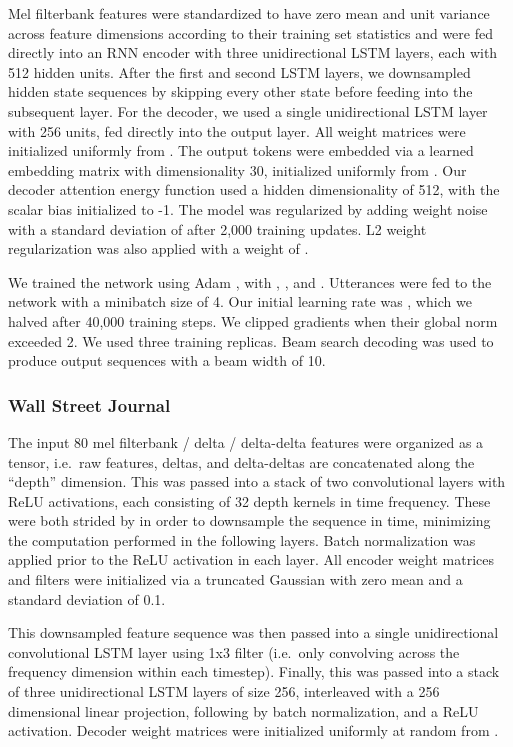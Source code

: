 \documentclass{article}
\begin{document}
Mel filterbank features were standardized to have zero mean and unit variance across feature dimensions according to their training set statistics and were fed directly into an RNN encoder with three unidirectional LSTM layers, each with 512 hidden units.
After the first and second LSTM layers, we downsampled hidden state sequences by skipping every other state before feeding into the subsequent layer.
For the decoder, we used a single unidirectional LSTM layer with 256 units, fed directly into the output  layer.
All weight matrices were initialized uniformly from .
The output tokens were embedded via a learned embedding matrix with dimensionality 30, initialized uniformly from  .
Our decoder attention energy function used a hidden dimensionality of 512, with the scalar bias  initialized to -1.
The model was regularized by adding weight noise with a standard deviation of  after 2,000 training updates.
L2 weight regularization was also applied with a weight of .

We trained the network using Adam , with , , and .
Utterances were fed to the network with a minibatch size of 4.
Our initial learning rate was , which we halved after 40,000 training steps.
We clipped gradients when their global norm exceeded 2.
We used three training replicas.
Beam search decoding was used to produce output sequences with a beam width of 10.

\subsubsection{Wall Street Journal}
\label{sec:wsj_details}

The input 80 mel filterbank / delta / delta-delta features were organized as a  tensor, i.e.\ raw features, deltas, and delta-deltas are concatenated along the ``depth'' dimension.
This was passed into a stack of two convolutional layers with ReLU activations, each consisting of 32  depth kernels in time  frequency.
These were both strided by  in order to downsample the sequence in time, minimizing the computation performed in the following layers.
Batch normalization  was applied prior to the ReLU activation in each layer.
All encoder weight matrices and filters were initialized via a truncated Gaussian with zero mean and a standard deviation of 0.1.

This downsampled feature sequence was then passed into a single unidirectional convolutional LSTM layer using 1x3 filter (i.e.\ only convolving across the frequency dimension within each timestep).
Finally, this was passed into a stack of three unidirectional LSTM layers of size 256, interleaved with a 256 dimensional linear projection, following by batch normalization, and a ReLU activation.
Decoder weight matrices were initialized uniformly at random from .
\end{document}
